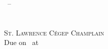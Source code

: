\begin{titlepage}
	\begin{center}
		\vspace*{0.5in}
		\LARGE{\textsc{\docTitle}}\\
		\vspace*{0.1in}
		\Large{\textsc{\docSubTitle}}\\
		\vfill
		\Large{\textsc{\docAuthorTitlePage}}\\
		\vspace*{0.1in}
		\Large{\textsc{\docClass\ –\ \docClassNumber}}\\
		\vfill
		\Large{\docClassTime}\\
		\vspace*{0.1in}
		\large{\textsc{\docClassInstructor}}\\
		\vfill
		\large{\textsc{St. Lawrence Cégep Champlain}}\\
		\vspace*{0.1in}
		\small{Due on \docDueDate\ at \docDueTime}\\
		\vfill
	\end{center}
\end{titlepage}
\pagebreak
